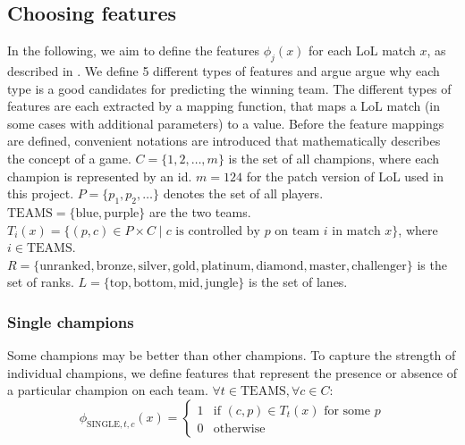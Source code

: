 \subsection{Choosing features}\label{sec:choosingfeatures}
In the following, we aim to define the features $\phi_j(x)$ for each LoL match $x$, as described in .
We define 5 different types of features and argue argue why each type is a good candidates for predicting the winning team.
The different types of features are each extracted by a mapping function, that maps a LoL match (in some cases with additional parameters) to a value. 
Before the feature mappings are defined, convenient notations are introduced that mathematically describes the concept of a game.
$C = \{1, 2, \dots, m\}$ is the set of all champions, where each champion is represented by an id. $m = 124$ for the patch version of LoL used in this project.
$P = \{p_1, p_2, \dots\}$ denotes the set of all players.
$\text{TEAMS} = \{\text{blue}, \text{purple}\}$ are the two teams.
$T_i(x) = \{ (p, c) \in P \times C \mid c \text{ is controlled by } p \text{ on team } i  \text{ in match } x \}$, where $i \in \text{TEAMS}$.\\
$R = \{\text{unranked},\text{bronze},\text{silver},\text{gold},\text{platinum},\text{diamond},\text{master},\text{challenger}\}$ is the set of ranks.
$L = \{\text{top},\text{bottom},\text{mid},\text{jungle}\}$ is the set of lanes.

\subsubsection{Single champions}
Some champions may be better than other champions. To capture the strength of individual champions, we define features that represent the presence or absence of a particular champion on each team.
$\forall t \in \text{TEAMS}, \forall c \in C:$
\begin{equation}\label{eq:single}  
\phi_{\text{SINGLE}, t, c}(x) = 
\begin{cases} 
  1 & \text{if } (c, p) \in T_t(x) \text{ for some } p \\
  0 & \text{otherwise} 
\end{cases}
\end{equation}


